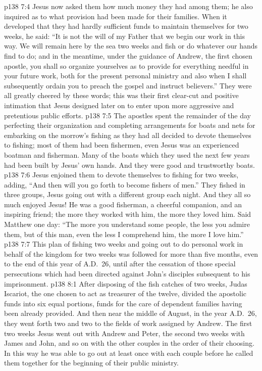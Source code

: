 \vs p138 7:4 Jesus now asked them how much money they had among them; he also inquired as to what provision had been made for their families. When it developed that they had hardly sufficient funds to maintain themselves for two weeks, he said: \textcolor{ubdarkred}{“It is not the will of my Father that we begin our work in this way. We will remain here by the sea two weeks and fish or do whatever our hands find to do; and in the meantime, under the guidance of Andrew, the first chosen apostle, you shall so organize yourselves as to provide for everything needful in your future work, both for the present personal ministry and also when I shall subsequently ordain you to preach the gospel and instruct believers.”} They were all greatly cheered by these words; this was their first clear\hyp{}cut and positive intimation that Jesus designed later on to enter upon more aggressive and pretentious public efforts.
\vs p138 7:5 The apostles spent the remainder of the day perfecting their organization and completing arrangements for boats and nets for embarking on the morrow’s fishing as they had all decided to devote themselves to fishing; most of them had been fishermen, even Jesus was an experienced boatman and fisherman. Many of the boats which they used the next few years had been built by Jesus’ own hands. And they were good and trustworthy boats.
\vs p138 7:6 Jesus enjoined them to devote themselves to fishing for two weeks, adding, \textcolor{ubdarkred}{“And then will you go forth to become fishers of men.”} They fished in three groups, Jesus going out with a different group each night. And they all so much enjoyed Jesus! He was a good fisherman, a cheerful companion, and an inspiring friend; the more they worked with him, the more they loved him. Said Matthew one day: “The more you understand some people, the less you admire them, but of this man, even the less I comprehend him, the more I love him.”
\vs p138 7:7 This plan of fishing two weeks and going out to do personal work in behalf of the kingdom for two weeks was followed for more than five months, even to the end of this year of A.D.~26, until after the cessation of those special persecutions which had been directed against John’s disciples subsequent to his imprisonment.
\vs p138 8:1 After disposing of the fish catches of two weeks, Judas Iscariot, the one chosen to act as treasurer of the twelve, divided the apostolic funds into six equal portions, funds for the care of dependent families having been already provided. And then near the middle of August, in the year A.D.~26, they went forth two and two to the fields of work assigned by Andrew. The first two weeks Jesus went out with Andrew and Peter, the second two weeks with James and John, and so on with the other couples in the order of their choosing. In this way he was able to go out at least once with each couple before he called them together for the beginning of their public ministry.

